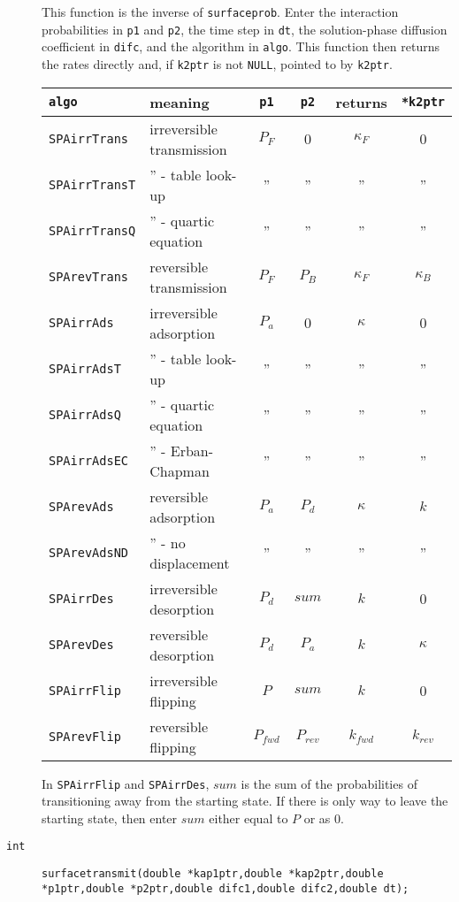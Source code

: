 \documentclass[11pt]{article}
\newcommand {\ttt} {\texttt}
\begin{document}
\begin{description}
This function is the inverse of \ttt{surfaceprob}. Enter the interaction probabilities in \ttt{p1} and \ttt{p2}, the time step in \ttt{dt}, the solution-phase diffusion coefficient in \ttt{difc}, and the algorithm in \ttt{algo}. This function then returns the rates directly and, if \ttt{k2ptr} is not \ttt{NULL}, pointed to by \ttt{k2ptr}.

\begin{longtable}[c]{llcccc}
\ttt{algo} & meaning & \ttt{p1} & \ttt{p2} & returns & \ttt{*k2ptr} \\
\hline
\ttt{SPAirrTrans} & irreversible transmission & $P_F$ & 0 & $\kappa_F$ & 0\\
\ttt{SPAirrTransT} & '' - table look-up & '' & '' & '' & '' \\
\ttt{SPAirrTransQ} & '' - quartic equation & '' & '' & '' & '' \\
\ttt{SPArevTrans} & reversible transmission & $P_F$ & $P_B$ & $\kappa_F$ & $\kappa_B$ \\
\ttt{SPAirrAds} & irreversible adsorption & $P_a$ & 0 & $\kappa$ & 0\\
\ttt{SPAirrAdsT} & '' - table look-up & '' & '' & '' & ''\\
\ttt{SPAirrAdsQ} & '' - quartic equation & '' & '' & '' & ''\\
\ttt{SPAirrAdsEC} & '' - Erban-Chapman & '' & '' & '' & ''\\
\ttt{SPArevAds} & reversible adsorption & $P_a$ & $P_d$ & $\kappa$ & $k$\\
\ttt{SPArevAdsND} & '' - no displacement & '' & '' & '' & ''\\
\ttt{SPAirrDes} & irreversible desorption & $P_d$ & $sum$ & $k$ & 0\\
\ttt{SPArevDes} & reversible desorption & $P_d$ & $P_a$ & $k$ & $\kappa$ \\
\ttt{SPAirrFlip} & irreversible flipping & $P$ & $sum$ & $k$ & 0\\
\ttt{SPArevFlip} & reversible flipping & $P_{fwd}$ & $P_{rev}$ & $k_{fwd}$ & $k_{rev}$
\end{longtable}

In \ttt{SPAirrFlip} and \ttt{SPAirrDes}, $sum$ is the sum of the probabilities of transitioning away from the starting state. If there is only way to leave the starting state, then enter $sum$ either equal to $P$ or as 0.


\item[\ttt{int}]
\ttt{surfacetransmit(double *kap1ptr,double *kap2ptr,double *p1ptr,double *p2ptr,double difc1,double difc2,double dt);}


\end{description}
\end{document}
